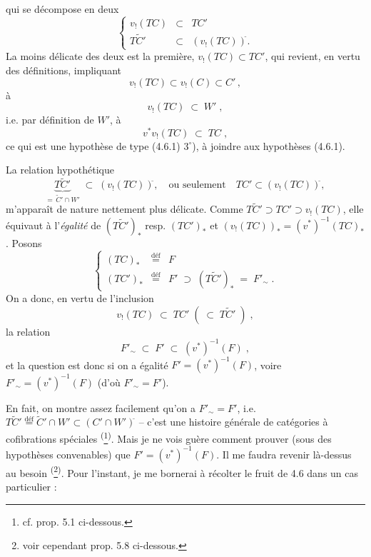 \documentclass[11pt]{article}
\newcommand{\printedpage}[1]{\marginpar{\footnotesize p.~#1}}
\newcommand{\msp}[1]{\marginpar{\footnotesize [#1]}}
\newcommand{\defeq}{\overset{\text{déf}}{=}}
\newcommand{\cl}{^{\tilde{}}}%
\begin{document}
\printedpage{39}
qui se décompose en deux
\[
\left\{
\begin{array}{rcl}
v_{!}(TC) & \subset & TC' \\
T\tilde{C}' & \subset & (v_{!}(TC))\cl.
\end{array}
\right.
\tag*{(4.7.3)}
\]
La moins délicate des deux est la \msp{page 80} première, $v_{!}(TC) \subset TC'$, qui revient, en vertu des définitions, impliquant
\[
v_{!}(TC) \subset v_{!}(C) \subset C' \, ,
\]
à
\[
v_{!}(TC) \;\subset\; W' \; ,
\]
i.e. par définition de $W'$, à
\[
v^{*}v_{!}(TC) \;\subset\; TC \; ,
\tag*{(4.7.4)}
\]
ce qui est une hypothèse de type (4.6.1) $3^{\circ}$), à joindre aux hypothèses (4.6.1).

La relation hypothétique
\[
\underbrace{T\tilde{C}'}_{=\,\tilde{C}'\cap W'} \;\subset\; (v_{!}(TC))\cl, \quad \text{ou seulement} \quad TC' \subset (v_{!}(TC))\cl,
\tag*{$(*)$}
\]
m'apparaît de nature nettement plus délicate. Comme $T\tilde{C}' \supset TC' \supset v_{!}(TC)$, elle équivaut à l'\textit{égalité} de $(T\tilde{C}')_{*}$ resp. $(TC')_{*}$ et $(v_{!}(TC))_{*} = (v^{*})^{-1}(TC)_{*}$. Posons
\[
\left\{
\begin{array}{lcl}
(TC)_{*} & \defeq & F \\
(TC')_{*} & \defeq & F' \;\supset\; (T\tilde{C}')_{*} \;=\; F'_{\sim} \; .
\end{array}
\right.
\tag*{(4.7.5)}
\]
On a donc, en vertu de l'inclusion
\[
v_{!}(TC) \;\subset\; TC' \; ( \;\subset\; T\tilde{C}' \; ) \; ,
\]
la relation
\[
F'_{\sim} \;\subset\; F' \;\subset\; (v^{*})^{-1}(F) \; ,
\tag*{(4.7.6)}
\]
et la question est donc si on a égalité $F' = (v^{*})^{-1}(F)$, voire $F'_{\sim} = (v^{*})^{-1}(F)$ (d'où $F'_{\sim} = F'$).

\msp{page 81}

En fait, on montre assez facilement qu'on a $F'_{\sim} = F'$, i.e. $T\tilde{C}' \defeq \tilde{C}' \cap W' \subset (C' \cap W')\cl$ -- c'est une histoire générale de catégories à cofibrations spéciales \textsuperscript{(}\footnote[21]{cf. prop. 5.1 ci-dessous.}\textsuperscript{)}. Mais je ne vois guère comment prouver (sous des hypothèses convenables) que $F' = (v^{*})^{-1}(F)$. Il me faudra revenir là-dessus au besoin \textsuperscript{(}\footnote[22]{voir cependant prop. 5.8 ci-dessous.}\textsuperscript{)}. Pour l'instant, je me bornerai à récolter le fruit de 4.6 dans un cas particulier :
\end{document}
